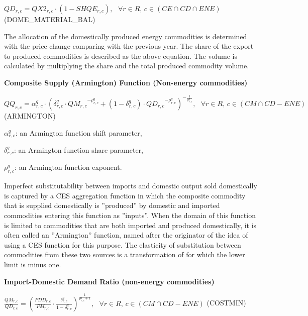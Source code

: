 \documentclass[10pt,a4paper,titlepage,dvipdfmx]{book}
\begin{document}
\begin{center}$QD_{r,c}=QX2_{r,c}\cdot \left(1-SHQE_{r,c}\right),\,\,\,\,\forall r\in R,\,c\in \left(CE\cap CD\cap ENE\right)$ (DOME\_MATERIAL\_BAL)
\end{center}

The allocation of the domestically produced energy commodities is determined with the price change comparing with the previous year. The share of the export to produced commodities is described as the above equation. The volume is calculated by multiplying the share and the total produced commodity volume.

\begin{flushleft}\textbf{Composite Supply (Armington) Function (Non-energy commodities)}\end{flushleft}


\begin{center}$QQ_{r,c}=\alpha _{r,c}^{q}\cdot \left(\delta _{r,c}^{q}\cdot Q{M_{r,c}}^{-\rho _{r,c}^{q}}+\left(1-\delta _{r,c}^{q}\right)\cdot Q{D_{r,c}}^{-\rho _{r,c}^{q}}\right)^{-\frac{1}{\rho _{r,c}^{q}}},\,\,\,\,\forall r\in R,\,c\in \left(CM\cap CD-ENE\right)$ (ARMINGTON)
\end{center}

\begin{flushleft}
$\alpha _{r,c}^{q}$: an Armington function shift parameter,

$\delta _{r,c}^{q}$: an Armington function share parameter,

$\rho _{r,c}^{q}$: an Armington function exponent.
\end{flushleft}

Imperfect substitutability between imports and domestic output sold domestically is captured by a CES aggregation function in which the composite commodity that is supplied domestically is ''produced'' by domestic and imported commodities entering this function as ''inputs''. When the domain of this function is limited to commodities that are both imported and produced domestically, it is often called an ''Armington'' function, named after the originator of the idea of using a CES function for this purpose. The elasticity of substitution between commodities from these two sources is a transformation of for which the lower limit is minus one.

\begin{flushleft}\textbf{Import-Domestic Demand Ratio (non-energy commodities)}\end{flushleft}


\begin{center}$\frac{QM_{r,c}}{QD_{r,c}}=\left(\frac{PDD_{r,c}}{PM_{r,c}}\cdot \frac{\delta _{r,c}^{q}}{1-\delta _{r,c}^{q}}\right)^{\frac{1}{\rho _{r,c}^{q}+1}},\,\,\,\,\forall r\in R,\,c\in \left(CM\cap CD-ENE\right)$ (COSTMIN)
\end{center}
\end{document}
